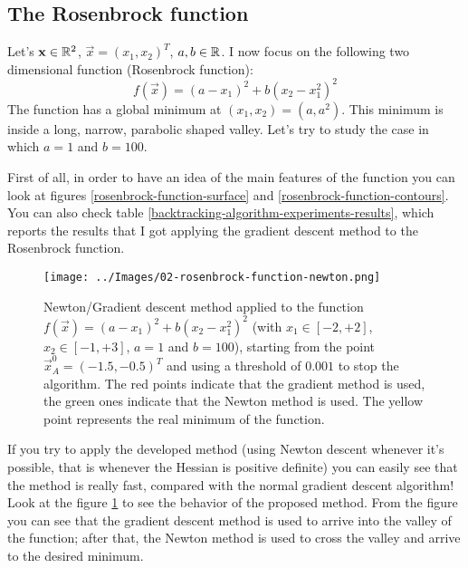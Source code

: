         \subsection{The Rosenbrock function}
            Let's \(\mathbf{x} \in \mathbb{R}^2\), \(\vec{x} = (x_1, x_2)^T\), \(a,b \in \mathbb{R}\). I now focus on the following two dimensional function (Rosenbrock function):
            \[f(\vec{x}) = (a - x_1)^2 + b(x_2 - x_1^2)^2\]
            The function has a global minimum at \((x_1, x_2) = (a, a^2)\). This minimum is inside a long, narrow, parabolic shaped valley. Let's try to study the case in which \(a=1\) and \(b=100\).\par
            First of all, in order to have an idea of the main features of the function you can look at figures \ref{rosenbrock-function-surface} and \ref{rosenbrock-function-contours}. You can also check table \ref{backtracking-algorithm-experiments-results}, which reports the results that I got applying the gradient descent method to the Rosenbrock function.
            \begin{figure}
                \centering
                \texttt{[image: ../Images/02-rosenbrock-function-newton.png]}
                \caption{Newton/Gradient descent method applied to the function \(f(\vec{x}) = (a - x_1)^2 + b(x_2 - x_1^2)^2\) (with \(x_1 \in [-2, +2]\), \(x_2 \in [-1, +3]\), \(a=1\) and \(b=100\)), starting from the point \(\vec{x}_A^0 = (-1.5,-0.5)^T\) and using a threshold of \(0.001\) to stop the algorithm. The red points indicate that the gradient method is used, the green ones indicate that the Newton method is used. The yellow point represents the real minimum of the function.}
                \label{rosenbrock-function-newton}
            \end{figure}
            If you try to apply the developed method (using Newton descent whenever it's possible, that is whenever the Hessian is positive definite) you can easily see that the method is really fast, compared with the normal gradient descent algorithm! Look at the figure \ref{rosenbrock-function-newton} to see the behavior of the proposed method. From the figure you can see that the gradient descent method is used to arrive into the valley of the function; after that, the Newton method is used to cross the valley and arrive to the desired minimum.